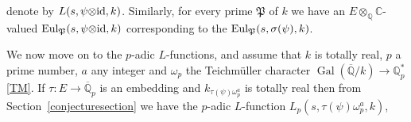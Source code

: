 \documentclass{amsart}
\begin{document}
denote by $ {L(s,{\psi{\otimes}{\textup{id}}},k)}$.
Similarly, for every prime $ {\mathfrak P} $ of $ k $ we have an $ E{\otimes}_{\mathbb Q}{\mathbb C} $-valued $ {\textup{Eul}}_{\mathfrak P}( s, \psi{\otimes}{\textup{id}}, k) $
corresponding to the $ {\textup{Eul}}_{\mathfrak P}(s,{\sigma}(\psi),k) $.

We now move on to the {$p$-adic{\futurelet{}}} {$L$-functions{\futurelet{}}}, and assume that $ k $ is totally real, $ p $ a
prime number, $ a $ any integer and $ \omega_p $ the Teichm\"uller character $ {\operatorname{Gal}}({\overline{\mathbb Q}}/k) \to {\mathbb Q}_p^* $
\eqref{TM}.
If $ {\tau} : E \to {{\overline {\mathbb Q}_p}} $ is an embedding and $ k_{{\tau}(\psi)\omega_p^a} $ is totally real
then from Section~\ref{conjecturesection} we have the {$p$-adic{\futurelet{}}} {$L$-function{\futurelet{}}} $ {L_{p}(s,{\tau}(\psi)\omega_p^a,k)}$,
\end{document}
